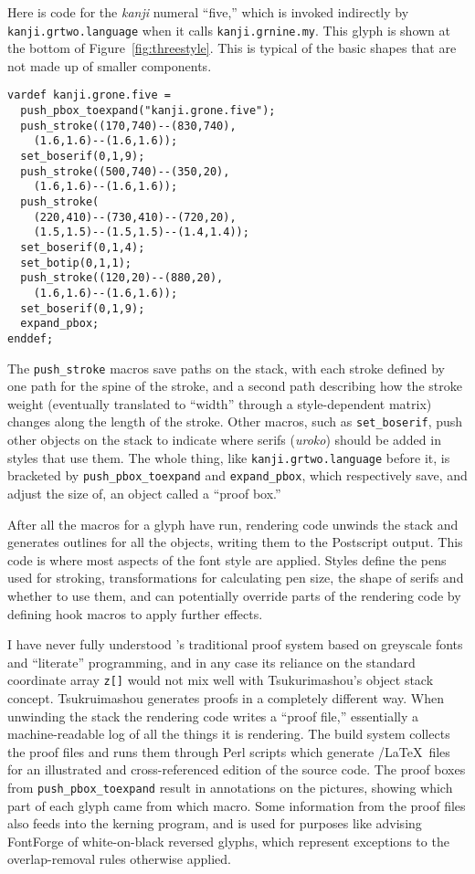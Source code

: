 \documentclass{ltugboat}
\begin{document}
Here is code for the \emph{kanji} numeral ``five,'' which is invoked indirectly by
\verb|kanji.grtwo.language|
\linebreak%
 when it calls \verb|kanji.grnine.my|.  This
glyph is shown at the bottom of Figure~\ref{fig:threestyle}.  This is
typical of the basic shapes that are not made up of smaller components.
\begin{verbatim}
vardef kanji.grone.five =
  push_pbox_toexpand("kanji.grone.five");
  push_stroke((170,740)--(830,740),
    (1.6,1.6)--(1.6,1.6));
  set_boserif(0,1,9);
  push_stroke((500,740)--(350,20),
    (1.6,1.6)--(1.6,1.6));
  push_stroke(
    (220,410)--(730,410)--(720,20),
    (1.5,1.5)--(1.5,1.5)--(1.4,1.4));
  set_boserif(0,1,4);
  set_botip(0,1,1);
  push_stroke((120,20)--(880,20),
    (1.6,1.6)--(1.6,1.6));
  set_boserif(0,1,9);
  expand_pbox;
enddef;
\end{verbatim}

The \verb|push_stroke| macros save paths on the 
\linebreak
stack, with each stroke
defined by one path for the spine of the stroke, and a second path
describing how the stroke weight (eventually translated to ``width'' through
a style-dependent matrix) changes along the length of the stroke.  Other
macros, such as \verb|set_boserif|, push other objects on the stack to indicate
where serifs (\emph{uroko}) should be added in styles that use them.  The
whole thing, like
\linebreak%
\verb|kanji.grtwo.language| before it, is bracketed by
\verb|push_pbox_toexpand| and \verb|expand_pbox|, which respectively save, and adjust
the size of, an object called a ``proof box.''

After all the macros for a glyph have run, rendering code unwinds the stack
and generates outlines for all the objects, writing them to the Postscript
output.  This code is where most aspects of the font style are applied. 
Styles define the pens used for stroking, transformations for calculating
pen size, the shape of serifs and whether to use them, and can potentially
override parts of the rendering code by defining hook macros to apply
further effects.

I have never fully understood \MF's traditional proof system based on
greyscale fonts and ``literate'' programming, and in any case its reliance
on the standard coordinate array \verb|z[]| would not mix well with
Tsukurimashou's object stack concept.  Tsukruimashou generates proofs in a
completely different way.  When unwinding the stack the rendering code
writes a ``proof file,'' essentially a machine-readable log of all the
things it is rendering.  The build system collects the proof files and runs
them through Perl scripts which generate \TikZ/\LaTeX\ files for an
illustrated and cross-referenced edition of the source code.  The proof
boxes from \verb|push_pbox_toexpand| result in annotations on the pictures,
showing which part of each glyph came from which macro.  Some information
from the proof files also feeds into the kerning program, and is used for
purposes like advising FontForge of white-on-black reversed glyphs, which
represent exceptions to the overlap-removal rules otherwise
applied.
\end{document}
